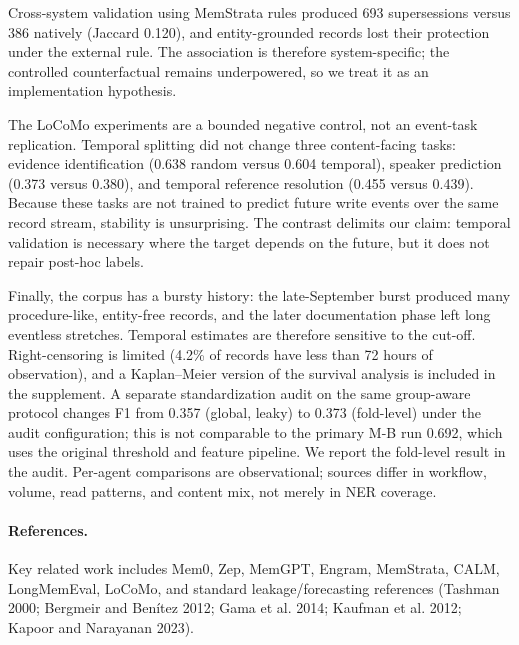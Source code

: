 \documentclass[sigconf,nonacm]{acmart}
\begin{document}
Cross-system validation using MemStrata rules produced 693 supersessions versus 386 natively (Jaccard 0.120), and entity-grounded records lost their protection under the external rule. The association is therefore system-specific; the controlled counterfactual remains underpowered, so we treat it as an implementation hypothesis.

The LoCoMo experiments are a bounded negative control, not an event-task replication. Temporal splitting did not change three content-facing tasks: evidence identification (0.638 random versus 0.604 temporal), speaker prediction (0.373 versus 0.380), and temporal reference resolution (0.455 versus 0.439). Because these tasks are not trained to predict future write events over the same record stream, stability is unsurprising. The contrast delimits our claim: temporal validation is necessary where the target depends on the future, but it does not repair post-hoc labels.

Finally, the corpus has a bursty history: the late-September burst produced many procedure-like, entity-free records, and the later documentation phase left long eventless stretches. Temporal estimates are therefore sensitive to the cut-off. Right-censoring is limited (4.2\% of records have less than 72 hours of observation), and a Kaplan--Meier version of the survival analysis is included in the supplement. A separate standardization audit on the same group-aware protocol changes F1 from 0.357 (global, leaky) to 0.373 (fold-level) under the audit configuration; this is not comparable to the primary M-B run 0.692, which uses the original threshold and feature pipeline. We report the fold-level result in the audit. Per-agent comparisons are observational; sources differ in workflow, volume, read patterns, and content mix, not merely in NER coverage.

\paragraph{References.} Key related work includes Mem0, Zep, MemGPT, Engram, MemStrata, CALM, LongMemEval, LoCoMo, and standard leakage/forecasting references (Tashman 2000; Bergmeir and Benítez 2012; Gama et al. 2014; Kaufman et al. 2012; Kapoor and Narayanan 2023).
\end{document}
